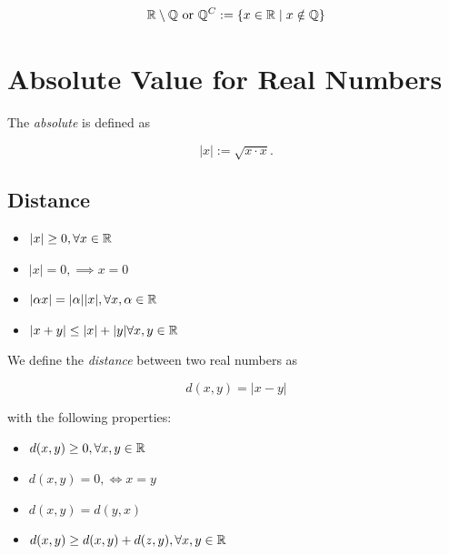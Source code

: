 \[
	\mathbb{R} \setminus \mathbb{Q} \text{ or } \mathbb{Q}^C := \{x \in \mathbb{R} \mid x \notin \mathbb{Q}\}
\]

\section{Absolute Value for Real Numbers}

The \emph{absolute} is defined as

\[
	|x| := \sqrt{x \cdot x}.
\]

\subsection{Distance}

\begin{itemize}

	\item \(|x| \ge 0, \forall x \in \mathbb{R}\)

	\item \(|x| = 0, \implies x = 0\)

	\item \(|\alpha x| = |\alpha| |x|, \forall x, \alpha \in \mathbb{R}\)

	\item \(|x + y| \le |x| + |y| \forall x,y \in \mathbb{R}\)

\end{itemize}

We define the \emph{distance} between two real numbers as

\[
	d(x,y) = | x - y |
\]

with the following properties:

\begin{itemize}

	\item \(d(x,y) \ge 0, \forall x,y \in \mathbb{R}\)

	\item \(d(x,y) = 0, \iff x = y \)

	\item \(d(x,y) = d(y,x)\)

	\item \(d(x,y) \ge d(x,y) + d(z,y), \forall x,y \in \mathbb{R}\)

\end{itemize}

